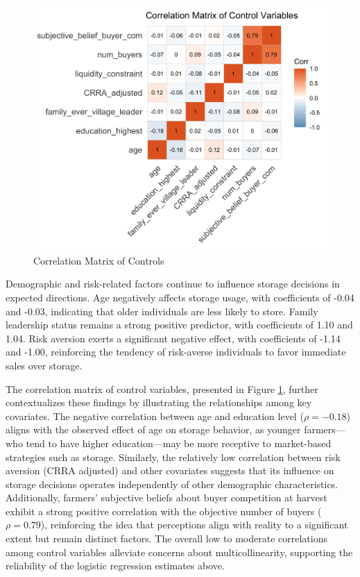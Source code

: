 \documentclass[12pt]{article}
\begin{document}
\newpage
\begin{figure}[ht]
\centering
\includegraphics[width=1\textwidth]{figures/correlation_matrix_controls.png}
\caption{Correlation Matrix of Controls}
\label{Figure: Correlation Matrix of Controls}
\end{figure}

Demographic and risk-related factors continue to influence storage decisions in expected directions. Age negatively affects storage usage, with coefficients of -0.04 and -0.03, indicating that older individuals are less likely to store. Family leadership status remains a strong positive predictor, with coefficients of 1.10 and 1.04. Risk aversion exerts a significant negative effect, with coefficients of -1.14 and -1.00, reinforcing the tendency of risk-averse individuals to favor immediate sales over storage.  

The correlation matrix of control variables, presented in Figure \ref{Figure: Correlation Matrix of Controls}, further contextualizes these findings by illustrating the relationships among key covariates. The negative correlation between age and education level ($\rho = -0.18$) aligns with the observed effect of age on storage behavior, as younger farmers—who tend to have higher education—may be more receptive to market-based strategies such as storage. Similarly, the relatively low correlation between risk aversion (CRRA adjusted) and other covariates suggests that its influence on storage decisions operates independently of other demographic characteristics. Additionally, farmers’ subjective beliefs about buyer competition at harvest exhibit a strong positive correlation with the objective number of buyers ($\rho = 0.79$), reinforcing the idea that perceptions align with reality to a significant extent but remain distinct factors. The overall low to moderate correlations among control variables alleviate concerns about multicollinearity, supporting the reliability of the logistic regression estimates above. 
\end{document}

